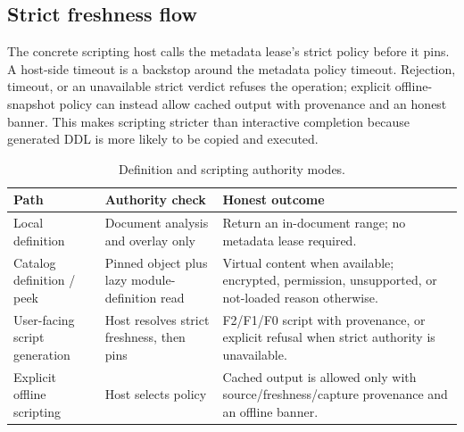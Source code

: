 \documentclass[11pt]{article}
\newcommand{\code}[1]{\texttt{\detokenize{#1}}}
\begin{document}
\subsection{Strict freshness flow}

The concrete scripting host calls the metadata lease's strict policy before it pins. A host-side timeout is a backstop around the metadata policy timeout. Rejection, timeout, or an unavailable strict verdict refuses the operation; explicit offline-snapshot policy can instead allow cached output with provenance and an honest banner. This makes scripting stricter than interactive completion because generated DDL is more likely to be copied and executed.


\begin{table}[H]
\centering
\small
\caption{Definition and scripting authority modes.}
\label{tab:scripting-authority}
\begin{tabularx}{\textwidth}{@{}>{\raggedright\arraybackslash}p{}>{\raggedright\arraybackslash}p{}>{\raggedright\arraybackslash}X@{}}
\toprule
\textbf{Path} & \textbf{Authority check} & \textbf{Honest outcome}\\
\midrule
Local definition & Document analysis and overlay only & Return an in-document range; no metadata lease required.\\
Catalog definition / peek & Pinned object plus lazy module-definition read & Virtual content when available; encrypted, permission, unsupported, or not-loaded reason otherwise.\\
User-facing script generation & Host resolves strict freshness, then pins & F2/F1/F0 script with provenance, or explicit refusal when strict authority is unavailable.\\
Explicit offline scripting & Host selects \code{offlineSnapshot} policy & Cached output is allowed only with source/freshness/capture provenance and an offline banner.\\
\bottomrule
\end{tabularx}
\end{table}
\end{document}
